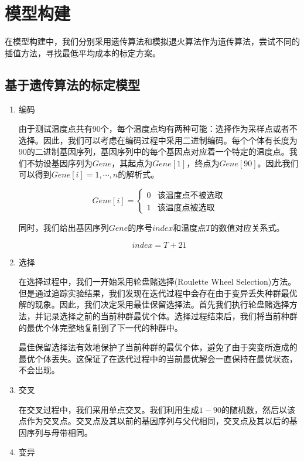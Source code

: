 \documentclass[10.5pt,twocolumn]{jbuaa}
\begin{document}
\section{模型构建}
在模型构建中，我们分别采用遗传算法和模拟退火算法作为遗传算法，尝试不同的插值方法，寻找最低平均成本的标定方案。
\subsection{基于遗传算法的标定模型}
\begin{enumerate}[label=(\roman*)]
	\item \hei 编码

	\normalfont 由于测试温度点共有90个，每个温度点均有两种可能：选择作为采样点或者不选择。因此，我们可以考虑在编码过程中采用二进制编码。每个个体有长度为90的二进制基因序列，基因序列中的每个基因点对应着一个特定的温度点。我们不妨设基因序列为$Gene$，其起点为$Gene[1]$，终点为$Gene[90]$。因此我们可以得到$Gene[i] = 1, 
	\cdots , n$的解析式。
	
	\begin{equation}
		Gene[i]=
		\begin{cases}
			0 & \text{该温度点不被选取}\\
			1 & \text{该温度点被选取}
		\end{cases}
	\end{equation}
	
	同时，我们给出基因序列$Gene$的序号$index$和温度点$T$的数值对应关系式。
	
	\begin{equation}
		index = T + 21
	\end{equation}
	
\item \hei 选择
\normalfont

在选择过程中，我们一开始采用轮盘赌选择(Roulette Wheel Selection)方法。但是通过追踪实验结果，我们发现在迭代过程中会存在由于变异丢失种群最优解的现象。因此，我们决定采用最佳保留选择法。首先我们执行轮盘赌选择方法，并记录选择之前的当前种群最优个体。选择过程结束后，我们将当前种群的最优个体完整地复制到了下一代的种群中。

最佳保留选择法有效地保护了当前种群的最优个体，避免了由于突变所造成的最优个体丢失。这保证了在迭代过程中的当前最优解会一直保持在最优状态，不会出现。
\item \hei 交叉
\normalfont

在交叉过程中，我们采用单点交叉。我们利用生成$1-90$的随机数，然后以该点作为交叉点。交叉点及其以前的基因序列与父代相同，交叉点及其以后的基因序列与母带相同。
\item \hei 变异
\normalfont


\end{enumerate}
\end{document}
